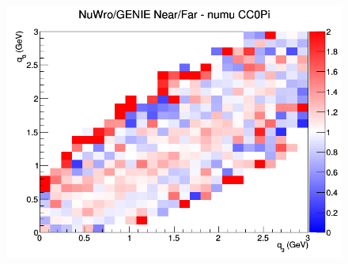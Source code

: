 \begin{figure}[h]
\endminipage
{}
\includegraphics[width=\linewidth]{eff_q0_q3/FGT/ratios/CC0Pi_NuWro_GENIE_numu_NF_q3_q0.png}
\endminipage
\newline
\end{figure}
\clearpage
